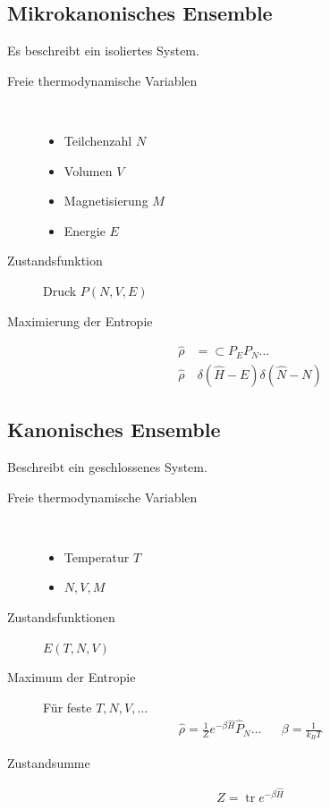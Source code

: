 \documentclass[11pt]{article}
\theoremstyle{plain}
\theoremstyle{mytheoremstyle}
\newcommand{\trace}{\operatorname{tr}}
\begin{document}
\subsection*{Mikrokanonisches Ensemble}
Es beschreibt ein isoliertes System.
\begin{description}
  \item[Freie thermodynamische Variablen] $ $ 
    \begin{itemize}
      \item Teilchenzahl $N$
      \item Volumen $V$
      \item Magnetisierung $M$
      \item Energie $E$
    \end{itemize}
  \item[Zustandsfunktion] Druck $P(N,V,E)$
  \item[Maximierung der Entropie] 
    \begin{align*}
      \hat{\rho} & = \subset P_E P_N \ldots \\
      \hat{\rho} & ~ \delta(\hat{H} - E) \delta (\hat{N} - N)
    \end{align*}
\end{description}
\subsection*{Kanonisches Ensemble}
Beschreibt ein geschlossenes System.
\begin{description}
  \item[Freie thermodynamische Variablen] $ $
    \begin{itemize}
      \item Temperatur $T$
      \item $N, V, M$
    \end{itemize}
  \item[Zustandsfunktionen] $E(T, N, V)$
  \item [Maximum der Entropie] 
    F\"ur feste $T, N, V, \ldots$
    \begin{align*}
      \hat{\rho} = \frac{1}{Z} e^{- \beta \hat{H} } \hat{P}_N \ldots && 
      \beta = \frac{1}{k_B T}
    \end{align*}
  \item[Zustandsumme]
    \begin{align*}
      Z= \trace e^{- \beta \hat{H}}
    \end{align*}
\end{description}
\end{document}
